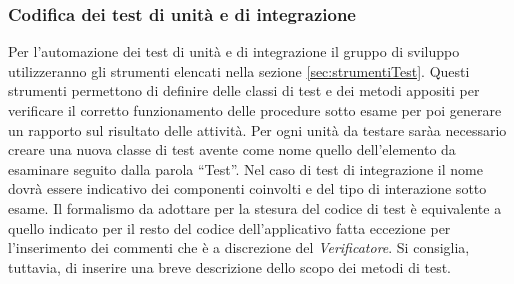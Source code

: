   \subsubsection{Codifica dei test di unità e di integrazione}
  Per l’automazione dei test di unità e di integrazione il gruppo di sviluppo utilizzeranno gli strumenti elencati nella sezione \ref{sec:strumentiTest}. Questi strumenti permettono di definire delle classi di test
  e dei metodi appositi per verificare il corretto funzionamento delle procedure sotto esame per poi generare un rapporto sul risultato delle attività.
  Per ogni unità da testare saràa necessario creare una nuova classe di test avente come nome quello dell’elemento da esaminare seguito dalla parola “Test”. Nel caso di test di integrazione il nome dovrà essere indicativo dei componenti coinvolti e del tipo di interazione sotto esame. Il formalismo da adottare per la stesura del codice di test è equivalente a quello indicato per il resto del codice dell’applicativo fatta eccezione per l’inserimento dei commenti che è a discrezione del \emph{Verificatore}. Si consiglia, tuttavia, di inserire una breve descrizione dello scopo dei metodi di test.
  
